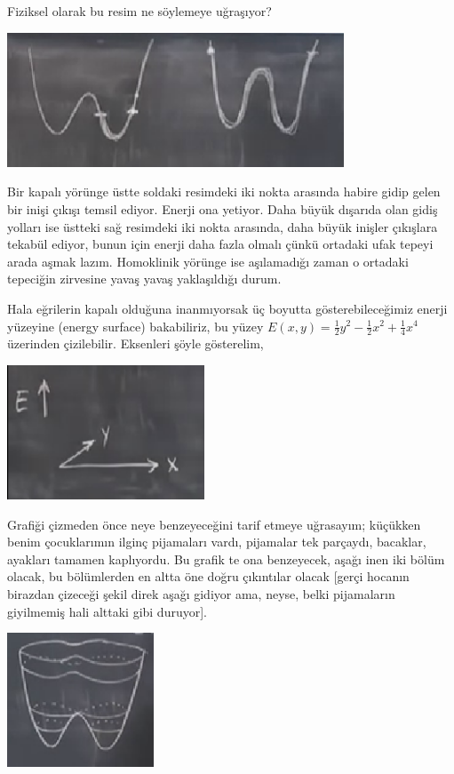 \documentclass[12pt,fleqn]{article}\usepackage{../../common}
\begin{document}
Fiziksel olarak bu resim ne söylemeye uğraşıyor? 

\includegraphics[height=4cm]{07_11.png}

Bir kapalı yörünge üstte soldaki resimdeki iki nokta arasında habire gidip gelen
bir inişi çıkışı temsil ediyor. Enerji ona yetiyor. Daha büyük dışarıda olan
gidiş yolları ise üstteki sağ resimdeki iki nokta arasında, daha büyük inişler
çıkışlara tekabül ediyor, bunun için enerji daha fazla olmalı çünkü ortadaki
ufak tepeyi arada aşmak lazım. Homoklinik yörünge ise aşılamadığı zaman o
ortadaki tepeciğin zirvesine yavaş yavaş yaklaşıldığı durum. 

Hala eğrilerin kapalı olduğuna inanmıyorsak üç boyutta gösterebileceğimiz enerji
yüzeyine (energy surface) bakabiliriz, bu yüzey $E(x,y) = \frac{1}{2}y^2 -
\frac{1}{2}x^2 + \frac{1}{4}x^4$ üzerinden çizilebilir. Eksenleri şöyle
gösterelim,

\includegraphics[height=4cm]{07_12.png}

Grafiği çizmeden önce neye benzeyeceğini tarif etmeye uğrasayım; küçükken benim
çocuklarımın ilginç pijamaları vardı, pijamalar tek parçaydı, bacaklar, ayakları
tamamen kaplıyordu. Bu grafik te ona benzeyecek, aşağı inen iki bölüm olacak, bu
bölümlerden en altta öne doğru çıkıntılar olacak [gerçi hocanın birazdan
çizeceği şekil direk aşağı gidiyor ama, neyse, belki pijamaların giyilmemiş hali
alttaki gibi duruyor].

\includegraphics[height=4cm]{07_13.png}
\end{document}
